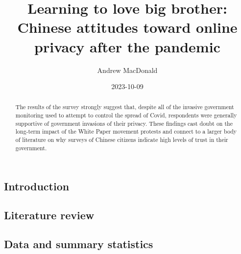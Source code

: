 \documentclass[
  letterpaper,
  DIV=11,
  numbers=noendperiod]{scrartcl}
\title{Learning to love big brother: Chinese attitudes toward online
privacy after the pandemic}
\author{Andrew MacDonald}
\date{2023-10-09}
\begin{document}
\maketitle
\begin{abstract}
The results of the survey strongly suggest that, despite all of the
invasive government monitoring used to attempt to control the spread of
Covid, respondents were generally supportive of government invasions of
their privacy. These findings cast doubt on the long-term impact of the
White Paper movement protests and connect to a larger body of literature
on why surveys of Chinese citizens indicate high levels of trust in
their government.
\end{abstract}
\ifdefined\Shaded\renewenvironment{Shaded}{\begin{tcolorbox}[boxrule=0pt, frame hidden, enhanced, sharp corners, interior hidden, borderline west={3pt}{0pt}{shadecolor}, breakable]}{\end{tcolorbox}}\fi

\hypertarget{introduction}{%
\subsection{Introduction}\label{introduction}}

\hypertarget{literature-review}{%
\subsection{Literature review}\label{literature-review}}

\hypertarget{sec-datasummary}{%
\subsection{Data and summary statistics}\label{sec-datasummary}}
\end{document}
